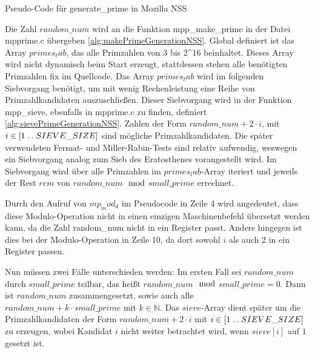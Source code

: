 \begin{algorithm}[h]
\DontPrintSemicolon
\caption{Pseudo-Code für generate_prime in Mozilla NSS}
\label{alg:genPrimeGenerationNSS}

\end{algorithm}

Die Zahl $random\_num$ wird an die Funktion mpp_make_prime in der Datei mpprime.c übergeben \ref{alg:makePrimeGenerationNSS}.
Global definiert ist das Array $primes_tab$, das alle Primzahlen von 3 bis 2^16 beinhaltet. Dieses Array wird nicht dynamisch beim Start erzeugt, stattdessen stehen alle benötigten Primzahlen fix im Quellcode. 
Das Array $primes_tab$ wird im folgenden Siebvorgang benötigt, um mit wenig Rechenleistung eine Reihe von Primzahlkandidaten auszuschließen.
Dieser Siebvorgang wird in der Funktion mpp_sieve, ebenfalls in mpprime.c zu finden, definiert \ref{alg:sievePrimeGenerationNSS}.
Zahlen der Form $random\_num + 2 \cdot i$, mit $i \in [1\mathrel{{.}\,{.}}\nobreak SIEVE\_SIZE]$ sind mögliche Primzahlkandidaten.
Die später verwendeten Fermat- und Miller-Rabin-Tests sind relativ aufwendig, weswegen ein Siebvorgang analog zum Sieb des Eratosthenes vorangestellt wird.
Im Siebvorgang wird über alle Primzahlen im $primes_tab$-Array iteriert und jeweils der Rest $rem$ von $random\_num$$\mod$$small\_prime$ errechnet.

Durch den Aufruf von $mp_mod_d$ im Pseudocode in Zeile 4 wird angedeutet, dass diese Modulo-Operation nicht in einen einzigen Maschinenbefehl übersetzt werden kann, da die Zahl random\_num nicht in ein Register passt. Anders hingegen ist dies bei der Modulo-Operation in Zeile 10, da dort sowohl $i$ als auch 2 in ein Register passen.

Nun müssen zwei Fälle unterschieden werden:
Im ersten Fall sei $random\_num$ durch $small\_prime$ teilbar, das heißt $random\_num$$\mod$$small\_prime = 0$.
Dann ist $random\_num$ zusammengesetzt, sowie auch alle $random\_num + k \cdot small\_prime$ mit $k \in \mathbb{N}$.
Das $sieve$-Array dient später um die Primzahlkandidaten der Form $random\_num + 2 \cdot i$ mit $i \in [1\mathrel{{.}\,{.}}\nobreak SIEVE\_SIZE]$ zu erzeugen, wobei Kandidat $i$ nicht weiter betrachtet wird, wenn $sieve[i]$ auf $1$ gesetzt ist.

